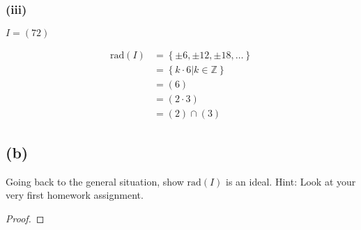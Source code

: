\documentclass[10pt]{armath}
\newcommand{\Z}{\mathbb{Z}}
\newcommand{\rad}[1]{\text{rad}\left(#1\right)}
\begin{document}
\subsubsection*{(iii)}%
\label{ssub:_i_}

$I=(72)$

\begin{align*}
  \rad{I}&=\left\{\pm6, \pm12, \pm18, \ldots\right\}\\
  &=\left\{k\cdot 6|k\in\Z\right\}\\
  &=(6)\\
  &=(2\cdot 3)\\
  &=(2)\cap(3)
\end{align*}

\subsection*{(b)}%
\label{sub:_b3_}

Going back to the general situation, show $\rad{I}$ is an ideal. Hint: Look at
your very first homework assignment.

\begin{proof}
   
\end{proof}
\end{document}
